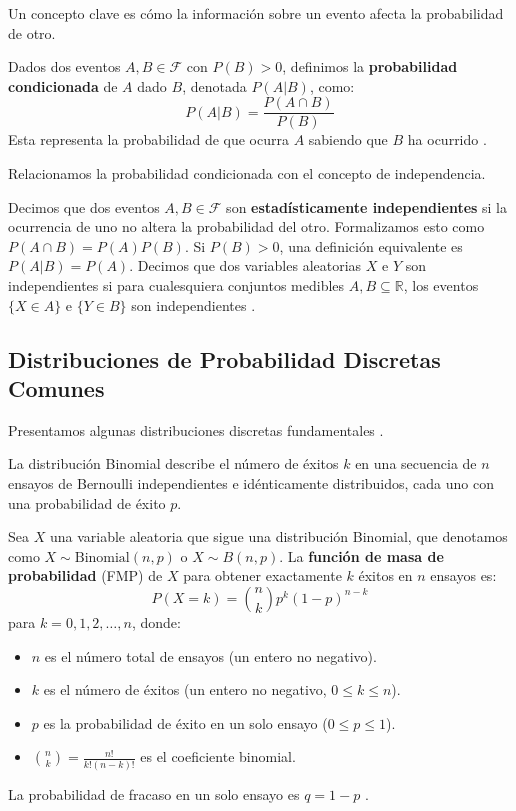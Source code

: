 Un concepto clave es cómo la información sobre un evento afecta la probabilidad de otro.

\begin{definition}
\label{def:conditional_prob_general}
Dados dos eventos $A, B \in \mathcal{F}$ con $P(B) > 0$, definimos la \textbf{probabilidad condicionada} de $A$ dado $B$, denotada $P(A|B)$, como:
\[ P(A|B) = \frac{P(A \cap B)}{P(B)} \]
Esta representa la probabilidad de que ocurra $A$ sabiendo que $B$ ha ocurrido \citep{Ross2014}.
\end{definition}

Relacionamos la probabilidad condicionada con el concepto de independencia.

\begin{definition}
\label{def:independence_general}
Decimos que dos eventos $A, B \in \mathcal{F}$ son \textbf{estadísticamente independientes} si la ocurrencia de uno no altera la probabilidad del otro. Formalizamos esto como $P(A \cap B) = P(A)P(B)$. Si $P(B)>0$, una definición equivalente es $P(A|B) = P(A)$. Decimos que dos variables aleatorias $X$ e $Y$ son independientes si para cualesquiera conjuntos medibles $A, B \subseteq \mathbb{R}$, los eventos $\{X \in A\}$ e $\{Y \in B\}$ son independientes \citep{CasellaBerger2002}.
\end{definition}

\subsection{Distribuciones de Probabilidad Discretas Comunes}

Presentamos algunas distribuciones discretas fundamentales \citep{Ross2014, CasellaBerger2002}.

\begin{definition}
\label{def:binomial_distribution}
La distribución Binomial describe el número de éxitos $k$ en una secuencia de $n$ ensayos de Bernoulli independientes e idénticamente distribuidos, cada uno con una probabilidad de éxito $p$.

Sea $X$ una variable aleatoria que sigue una distribución Binomial, que denotamos como $X \sim \text{Binomial}(n, p)$ o $X \sim B(n, p)$. La \textbf{función de masa de probabilidad} (FMP) de $X$ para obtener exactamente $k$ éxitos en $n$ ensayos es:
\[ P(X=k) = \binom{n}{k} p^k (1-p)^{n-k} \]
para $k = 0, 1, 2, \ldots, n$, donde:
\begin{itemize}
    \item $n$ es el número total de ensayos (un entero no negativo).
    \item $k$ es el número de éxitos (un entero no negativo, $0 \le k \le n$).
    \item $p$ es la probabilidad de éxito en un solo ensayo ($0 \le p \le 1$).
    \item $\binom{n}{k} = \frac{n!}{k!(n-k)!}$ es el coeficiente binomial.
\end{itemize}
La probabilidad de fracaso en un solo ensayo es $q = 1-p$ \citep{Ross2014}.
\end{definition}

